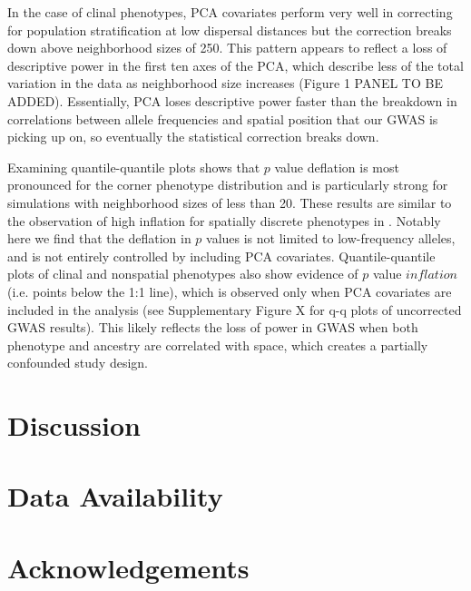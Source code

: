 \documentclass[9pt,twocolumn,twoside,lineno]{gsajnl}
\begin{document}
In the case of clinal phenotypes, PCA covariates perform very well in correcting for population stratification at low dispersal distances but the correction breaks down above neighborhood sizes of 250. This pattern appears to reflect a loss of descriptive power in the first ten axes of the PCA, which describe less of the total variation in the data as neighborhood size increases (Figure 1 PANEL TO BE ADDED). Essentially, PCA loses descriptive power faster than the breakdown in correlations between allele frequencies and spatial position that our GWAS is picking up on, so eventually the statistical correction breaks down. 

Examining quantile-quantile plots shows that $p$ value deflation is most pronounced for the corner phenotype distribution and is particularly strong for simulations with neighborhood sizes of less than 20. These results are similar to the observation of high inflation for spatially discrete phenotypes in \citep{Mathieson2012}. Notably here we find that the deflation in $p$ values is not limited to low-frequency alleles, and is not entirely controlled by including PCA covariates. Quantile-quantile plots of clinal and nonspatial phenotypes also show evidence of $p$ value $inflation$ (i.e. points below the 1:1 line), which is observed only when PCA covariates are included in the analysis (see Supplementary Figure X for q-q plots of uncorrected GWAS results). This likely reflects the loss of power in GWAS when both phenotype and ancestry are correlated with space, which creates a partially confounded study design. 







\section{Discussion}

\section{Data Availability}

\section{Acknowledgements}
\end{document}
